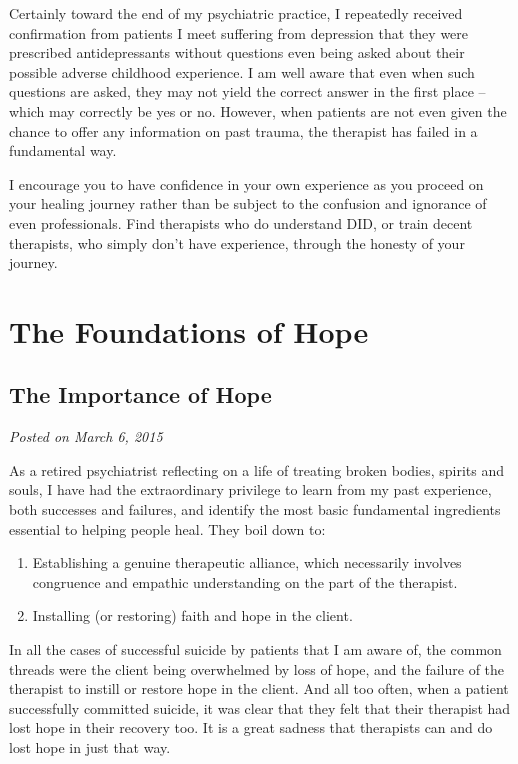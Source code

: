 \documentclass[]{book}
\begin{document}
Certainly toward the end of my psychiatric practice, I repeatedly received confirmation from patients I meet suffering from depression that they were prescribed antidepressants without questions even being asked about their possible adverse childhood experience. I am well aware that even when such questions are asked, they may not yield the correct answer in the first place -- which may correctly be yes or no. However, when patients are not even given the chance to offer any information on past trauma, the therapist has failed in a fundamental way.

I encourage you to have confidence in your own experience as you proceed on your healing journey rather than be subject to the confusion and ignorance of even professionals. Find therapists who do understand DID, or train decent therapists, who simply don't have experience, through the honesty of your journey.

\hypertarget{the-foundations-of-hope}{%
\chapter{The Foundations of Hope}\label{the-foundations-of-hope}}

\hypertarget{the-importance-of-hope}{%
\section{The Importance of Hope}\label{the-importance-of-hope}}

\emph{Posted on March 6, 2015}

As a retired psychiatrist reflecting on a life of treating broken bodies, spirits and souls, I have had the extraordinary privilege to learn from my past experience, both successes and failures, and identify the most basic fundamental ingredients essential to helping people heal.
They boil down to:

\begin{enumerate}
\def\labelenumi{\arabic{enumi}.}
\item
  Establishing a genuine therapeutic alliance, which necessarily involves congruence and empathic understanding on the part of the therapist.
\item
  Installing (or restoring) faith and hope in the client.
\end{enumerate}

In all the cases of successful suicide by patients that I am aware of, the common threads were the client being overwhelmed by loss of hope, and the failure of the therapist to instill or restore hope in the client. And all too often, when a patient successfully committed suicide, it was clear that they felt that their therapist had lost hope in their recovery too. It is a great sadness that therapists can and do lost hope in just that way.
\end{document}
